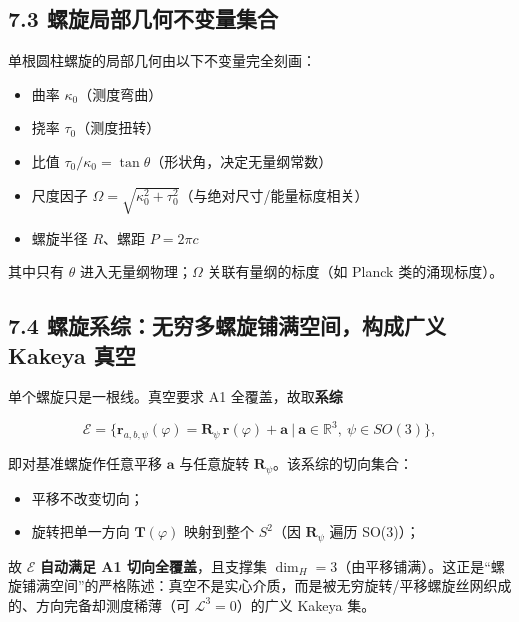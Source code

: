 \subsection{7.3
螺旋局部几何不变量集合}\label{ux87baux65cbux5c40ux90e8ux51e0ux4f55ux4e0dux53d8ux91cfux96c6ux5408}

单根圆柱螺旋的局部几何由以下不变量完全刻画：

\begin{itemize}
\tightlist
\item
  曲率 \(\kappa_0\)（测度弯曲）
\item
  挠率 \(\tau_0\)（测度扭转）
\item
  比值 \(\tau_0/\kappa_0=\tan\theta\)（形状角，决定无量纲常数）
\item
  尺度因子
  \(\Omega=\sqrt{\kappa_0^2+\tau_0^2}\)（与绝对尺寸/能量标度相关）
\item
  螺旋半径 \(R\)、螺距 \(P=2\pi c\)
\end{itemize}

其中只有 \(\theta\) 进入无量纲物理；\(\Omega\) 关联有量纲的标度（如
Planck 类的涌现标度）。

\subsection{7.4 螺旋系综：无穷多螺旋铺满空间，构成广义 Kakeya
真空}\label{ux87baux65cbux7cfbux7efcux65e0ux7a77ux591aux87baux65cbux94faux6ee1ux7a7aux95f4ux6784ux6210ux5e7fux4e49-kakeya-ux771fux7a7a}

单个螺旋只是一根线。真空要求 A1 全覆盖，故取\textbf{系综}

\[
\mathcal{E}=\bigl\{\mathbf{r}_{a,b,\psi}(\varphi)=\mathbf{R}_\psi\,\mathbf{r}(\varphi)+\mathbf{a}\ \big|\ \mathbf{a}\in\mathbb{R}^3,\ \psi\in SO(3)\bigr\},
\]

即对基准螺旋作任意平移 \(\mathbf{a}\) 与任意旋转
\(\mathbf{R}_\psi\)。该系综的切向集合：

\begin{itemize}
\tightlist
\item
  平移不改变切向；
\item
  旋转把单一方向 \(\mathbf{T}(\varphi)\) 映射到整个 \(S^2\)（因
  \(\mathbf{R}_\psi\) 遍历 SO(3)）；
\end{itemize}

故 \(\mathcal{E}\) \textbf{自动满足 A1 切向全覆盖}，且支撑集
\(\dim_H=3\)（由平移铺满）。这正是``螺旋铺满空间''的严格陈述：真空不是实心介质，而是被无穷旋转/平移螺旋丝网织成的、方向完备却测度稀薄（可
\(\mathcal{L}^3=0\)）的广义 Kakeya 集。

